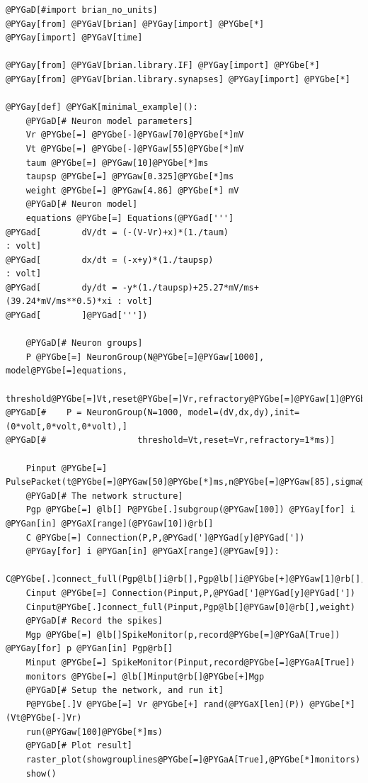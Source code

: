 \documentclass[letterpaper,10pt]{manual}
\begin{document}
\begin{Verbatim}[commandchars=@\[\]]
@PYGaD[#import brian_no_units]
@PYGay[from] @PYGaV[brian] @PYGay[import] @PYGbe[*]
@PYGay[import] @PYGaV[time]

@PYGay[from] @PYGaV[brian.library.IF] @PYGay[import] @PYGbe[*]
@PYGay[from] @PYGaV[brian.library.synapses] @PYGay[import] @PYGbe[*]

@PYGay[def] @PYGaK[minimal_example]():
    @PYGaD[# Neuron model parameters]
    Vr @PYGbe[=] @PYGbe[-]@PYGaw[70]@PYGbe[*]mV
    Vt @PYGbe[=] @PYGbe[-]@PYGaw[55]@PYGbe[*]mV
    taum @PYGbe[=] @PYGaw[10]@PYGbe[*]ms
    taupsp @PYGbe[=] @PYGaw[0.325]@PYGbe[*]ms
    weight @PYGbe[=] @PYGaw[4.86] @PYGbe[*] mV
    @PYGaD[# Neuron model]
    equations @PYGbe[=] Equations(@PYGad[''']
@PYGad[        dV/dt = (-(V-Vr)+x)*(1./taum)                            : volt]
@PYGad[        dx/dt = (-x+y)*(1./taupsp)                               : volt]
@PYGad[        dy/dt = -y*(1./taupsp)+25.27*mV/ms+(39.24*mV/ms**0.5)*xi : volt]
@PYGad[        ]@PYGad['''])

    @PYGaD[# Neuron groups]
    P @PYGbe[=] NeuronGroup(N@PYGbe[=]@PYGaw[1000], model@PYGbe[=]equations,
                  threshold@PYGbe[=]Vt,reset@PYGbe[=]Vr,refractory@PYGbe[=]@PYGaw[1]@PYGbe[*]ms)
@PYGaD[#    P = NeuronGroup(N=1000, model=(dV,dx,dy),init=(0*volt,0*volt,0*volt),]
@PYGaD[#                  threshold=Vt,reset=Vr,refractory=1*ms)]

    Pinput @PYGbe[=] PulsePacket(t@PYGbe[=]@PYGaw[50]@PYGbe[*]ms,n@PYGbe[=]@PYGaw[85],sigma@PYGbe[=]@PYGaw[1]@PYGbe[*]ms)
    @PYGaD[# The network structure]
    Pgp @PYGbe[=] @lb[] P@PYGbe[.]subgroup(@PYGaw[100]) @PYGay[for] i @PYGan[in] @PYGaX[range](@PYGaw[10])@rb[]
    C @PYGbe[=] Connection(P,P,@PYGad[']@PYGad[y]@PYGad['])
    @PYGay[for] i @PYGan[in] @PYGaX[range](@PYGaw[9]):
        C@PYGbe[.]connect_full(Pgp@lb[]i@rb[],Pgp@lb[]i@PYGbe[+]@PYGaw[1]@rb[],weight)
    Cinput @PYGbe[=] Connection(Pinput,P,@PYGad[']@PYGad[y]@PYGad['])
    Cinput@PYGbe[.]connect_full(Pinput,Pgp@lb[]@PYGaw[0]@rb[],weight)
    @PYGaD[# Record the spikes]
    Mgp @PYGbe[=] @lb[]SpikeMonitor(p,record@PYGbe[=]@PYGaA[True]) @PYGay[for] p @PYGan[in] Pgp@rb[]
    Minput @PYGbe[=] SpikeMonitor(Pinput,record@PYGbe[=]@PYGaA[True])
    monitors @PYGbe[=] @lb[]Minput@rb[]@PYGbe[+]Mgp
    @PYGaD[# Setup the network, and run it]
    P@PYGbe[.]V @PYGbe[=] Vr @PYGbe[+] rand(@PYGaX[len](P)) @PYGbe[*] (Vt@PYGbe[-]Vr)
    run(@PYGaw[100]@PYGbe[*]ms)
    @PYGaD[# Plot result]
    raster_plot(showgrouplines@PYGbe[=]@PYGaA[True],@PYGbe[*]monitors)
    show()



\end{Verbatim}
\end{document}
